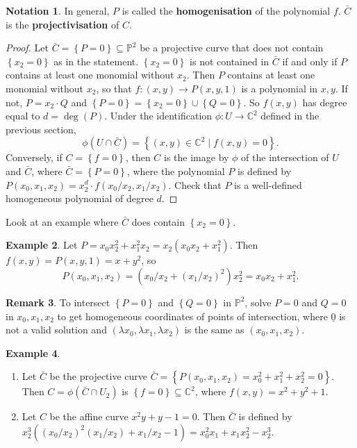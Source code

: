 \documentclass{article}
\newcommand{\C}{\mathbb{C}}
\renewcommand{\P}{\mathbb{P}}
\newcommand{\rb}[1]{\left( #1 \right)}
\newcommand{\cb}[1]{\left\{ #1 \right\}}
\theoremstyle{definition}\newtheorem{definition}{Definition}[section]
\theoremstyle{definition}\newtheorem{notation}[definition]{Notation}
\theoremstyle{definition}\newtheorem{remark}[definition]{Remark}
\theoremstyle{definition}\newtheorem{example}[definition]{Example}
\theoremstyle{definition}\newtheorem{fact}{Fact}
\theoremstyle{definition}\newtheorem{exercise}{Exercise}
\begin{document}
\begin{notation}
In general, $ P $ is called the \textbf{homogenisation} of the polynomial $ f $. $ \bar{C} $ is the \textbf{projectivisation} of $ C $.
\end{notation}

\begin{proof}
Let $ \bar{C} = \cb{P = 0} \subseteq \P^2 $ be a projective curve that does not contain $ \cb{x_2 = 0} $ as in the statement. $ \cb{x_2 = 0} $ is not contained in $ \bar{C} $ if and only if $ P $ contains at least one monomial without $ x_2 $. Then $ P $ contains at least one monomial without $ x_2 $, so that $ f : \rb{x, y} \to P\rb{x, y, 1} $ is a polynomial in $ x, y $. If not, $ P = x_2 \cdot Q $ and $ \cb{P = 0} = \cb{x_2 = 0} \cup \cb{Q = 0} $. So $ f\rb{x, y} $ has degree equal to $ d = \deg\rb{P} $. Under the identification $ \phi : U \to \C^2 $ defined in the previous section,
$$ \phi\rb{U \cap \bar{C}} = \cb{\rb{x, y} \in \C^2 \mid f\rb{x, y} = 0}. $$
Conversely, if $ C = \cb{f = 0} $, then $ C $ is the image by $ \phi $ of the intersection of $ U $ and $ \bar{C} $, where $ \bar{C} = \cb{P = 0} $, where the polynomial $ P $ is defined by $ P\rb{x_0, x_1, x_2} = x_2^d \cdot f\rb{x_0 / x_2, x_1 / x_2} $. Check that $ P $ is a well-defined homogeneous polynomial of degree $ d $.
\end{proof}

Look at an example where $ \bar{C} $ does contain $ \cb{x_2 = 0} $.

\begin{example}
Let $ P = x_0x_2^2 + x_1^2x_2 = x_2\rb{x_0x_2 + x_1^2} $. Then $ f\rb{x, y} = P\rb{x, y, 1} = x + y^2 $, so
$$ P\rb{x_0, x_1, x_2} = \rb{x_0 / x_2 + \rb{x_1 / x_2}^2}x_2^2 = x_0x_2 + x_1^2. $$
\end{example}

\begin{remark}
To intersect $ \cb{P = 0} $ and $ \cb{Q = 0} $ in $ \P^2 $, solve $ P = 0 $ and $ Q = 0 $ in $ x_0, x_1, x_2 $ to get homogeneous coordinates of points of intersection, where $ \underline{0} $ is not a valid solution and $ \rb{\lambda x_0, \lambda x_1, \lambda x_2} $ is the same as $ \rb{x_0, x_1, x_2} $.
\end{remark}

\begin{example}
\hfill
\begin{enumerate}
\item Let $ \bar{C} $ be the projective curve $ \bar{C} = \cb{P\rb{x_0, x_1, x_2} = x_0^2 + x_1^2 + x_2^2 = 0} $. Then $ C = \phi\rb{\bar{C} \cap U_2} $ is $ \cb{f = 0} \subseteq \C^2 $, where $ f\rb{x, y} = x^2 + y^2 + 1 $.
\item Let $ C $ be the affine curve $ x^2y + y - 1 = 0 $. Then $ \bar{C} $ is defined by $ x_2^3\rb{\rb{x_0 / x_2}^2\rb{x_1 / x_2} + x_1 / x_2 - 1} = x_0^2x_1 + x_1x_2^2 - x_2^3 $.
\end{enumerate}
\end{example}
\end{document}
